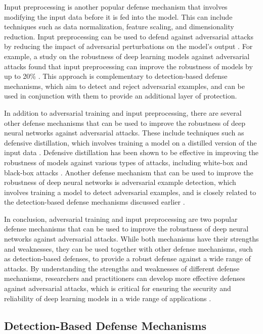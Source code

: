 \documentclass[11pt]{article}
\begin{document}
Input preprocessing is another popular defense mechanism that involves modifying the input data before it is fed into the model. This can include techniques such as data normalization, feature scaling, and dimensionality reduction. Input preprocessing can be used to defend against adversarial attacks by reducing the impact of adversarial perturbations on the model's output \cite{ref85}. For example, a study on the robustness of deep learning models against adversarial attacks found that input preprocessing can improve the robustness of models by up to 20\% \cite{ref86}. This approach is complementary to detection-based defense mechanisms, which aim to detect and reject adversarial examples, and can be used in conjunction with them to provide an additional layer of protection.

In addition to adversarial training and input preprocessing, there are several other defense mechanisms that can be used to improve the robustness of deep neural networks against adversarial attacks. These include techniques such as defensive distillation, which involves training a model on a distilled version of the input data \cite{ref87}. Defensive distillation has been shown to be effective in improving the robustness of models against various types of attacks, including white-box and black-box attacks \cite{ref88}. Another defense mechanism that can be used to improve the robustness of deep neural networks is adversarial example detection, which involves training a model to detect adversarial examples, and is closely related to the detection-based defense mechanisms discussed earlier \cite{ref89}.

In conclusion, adversarial training and input preprocessing are two popular defense mechanisms that can be used to improve the robustness of deep neural networks against adversarial attacks. While both mechanisms have their strengths and weaknesses, they can be used together with other defense mechanisms, such as detection-based defenses, to provide a robust defense against a wide range of attacks. By understanding the strengths and weaknesses of different defense mechanisms, researchers and practitioners can develop more effective defenses against adversarial attacks, which is critical for ensuring the security and reliability of deep learning models in a wide range of applications \cite{ref90}.

\subsection{Detection-Based Defense Mechanisms}
\end{document}
